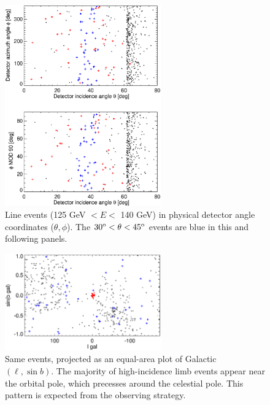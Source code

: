 \documentclass[aps,twocolumn,prd,superscriptaddress,showpacs,nofootinbib,fixfloat]{revtex4}
\newcommand{\degree}{^{\rm o}}
\begin{document}
\begin{figure}[p]
\centering
\includegraphics[width=0.6\textwidth]{plots/theta-phi.ps}
\caption{Line events (125 GeV $< E <$ 140 GeV) in physical detector angle
  coordinates ($\theta, \phi$).  The $30\degree < \theta < 45\degree$ events
  are blue in this and following panels.  }
\label{fig:theta-phi}
\end{figure}

\begin{figure}[p]
\centering
\includegraphics[width=0.6\textwidth]{plots/l-b.ps}
\caption{Same events, projected as an equal-area plot of Galactic $(\ell, \sin
  b)$.  The majority of high-incidence limb events appear near the orbital
  pole, which precesses around the celestial pole.  This pattern is expected
  from the observing strategy. }
\label{fig:l-b}
\end{figure}
\end{document}
